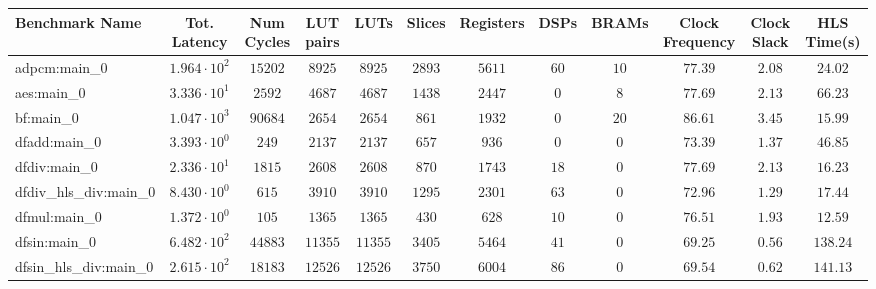 \begin{tabular}{|l|c|c|c|c|c|c|c|c|c|c|c|}
\hline
Benchmark Name          & Tot. Latency           & Num Cycles & LUT pairs & LUTs      & Slices    & Registers & DSPs    & BRAMs   & Clock Frequency & Clock Slack & HLS Time(s) \\
\hline
adpcm:main\_0           & $ 1.964 \cdot 10^{2} $ & $ 15202  $ & $ 8925  $ & $ 8925  $ & $ 2893  $ & $ 5611  $ & $ 60  $ & $ 10  $ & $ 77.39       $ & $ 2.08    $ & $ 24.02   $ \\
aes:main\_0             & $ 3.336 \cdot 10^{1} $ & $ 2592   $ & $ 4687  $ & $ 4687  $ & $ 1438  $ & $ 2447  $ & $ 0   $ & $ 8   $ & $ 77.69       $ & $ 2.13    $ & $ 66.23   $ \\
bf:main\_0              & $ 1.047 \cdot 10^{3} $ & $ 90684  $ & $ 2654  $ & $ 2654  $ & $ 861   $ & $ 1932  $ & $ 0   $ & $ 20  $ & $ 86.61       $ & $ 3.45    $ & $ 15.99   $ \\
dfadd:main\_0           & $ 3.393 \cdot 10^{0} $ & $ 249    $ & $ 2137  $ & $ 2137  $ & $ 657   $ & $ 936   $ & $ 0   $ & $ 0   $ & $ 73.39       $ & $ 1.37    $ & $ 46.85   $ \\
dfdiv:main\_0           & $ 2.336 \cdot 10^{1} $ & $ 1815   $ & $ 2608  $ & $ 2608  $ & $ 870   $ & $ 1743  $ & $ 18  $ & $ 0   $ & $ 77.69       $ & $ 2.13    $ & $ 16.23   $ \\
dfdiv\_hls\_div:main\_0 & $ 8.430 \cdot 10^{0} $ & $ 615    $ & $ 3910  $ & $ 3910  $ & $ 1295  $ & $ 2301  $ & $ 63  $ & $ 0   $ & $ 72.96       $ & $ 1.29    $ & $ 17.44   $ \\
dfmul:main\_0           & $ 1.372 \cdot 10^{0} $ & $ 105    $ & $ 1365  $ & $ 1365  $ & $ 430   $ & $ 628   $ & $ 10  $ & $ 0   $ & $ 76.51       $ & $ 1.93    $ & $ 12.59   $ \\
dfsin:main\_0           & $ 6.482 \cdot 10^{2} $ & $ 44883  $ & $ 11355 $ & $ 11355 $ & $ 3405  $ & $ 5464  $ & $ 41  $ & $ 0   $ & $ 69.25       $ & $ 0.56    $ & $ 138.24  $ \\
dfsin\_hls\_div:main\_0 & $ 2.615 \cdot 10^{2} $ & $ 18183  $ & $ 12526 $ & $ 12526 $ & $ 3750  $ & $ 6004  $ & $ 86  $ & $ 0   $ & $ 69.54       $ & $ 0.62    $ & $ 141.13  $ \\

\end{tabular}
